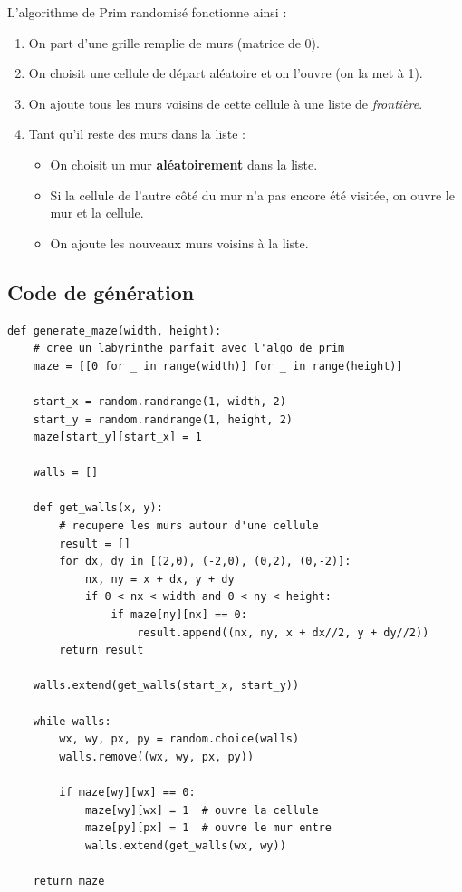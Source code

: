 \documentclass[12pt,a4paper]{article}
\begin{document}
L'algorithme de Prim randomisé fonctionne ainsi :
\begin{enumerate}
    \item On part d'une grille remplie de murs (matrice de 0).
    \item On choisit une cellule de départ aléatoire et on l'ouvre (on la met à 1).
    \item On ajoute tous les murs voisins de cette cellule à une liste de \textit{frontière}.
    \item Tant qu'il reste des murs dans la liste :
    \begin{itemize}
        \item On choisit un mur \textbf{aléatoirement} dans la liste.
        \item Si la cellule de l'autre côté du mur n'a pas encore été visitée, on ouvre le mur et la cellule.
        \item On ajoute les nouveaux murs voisins à la liste.
    \end{itemize}
\end{enumerate}

\subsection{Code de génération}

\begin{lstlisting}[caption={Génération du labyrinthe parfait avec Prim (\texttt{maze\_prim.py})}]
def generate_maze(width, height):
    # cree un labyrinthe parfait avec l'algo de prim
    maze = [[0 for _ in range(width)] for _ in range(height)]
    
    start_x = random.randrange(1, width, 2)
    start_y = random.randrange(1, height, 2)
    maze[start_y][start_x] = 1
    
    walls = []
    
    def get_walls(x, y):
        # recupere les murs autour d'une cellule
        result = []
        for dx, dy in [(2,0), (-2,0), (0,2), (0,-2)]:
            nx, ny = x + dx, y + dy
            if 0 < nx < width and 0 < ny < height:
                if maze[ny][nx] == 0:
                    result.append((nx, ny, x + dx//2, y + dy//2))
        return result
    
    walls.extend(get_walls(start_x, start_y))
    
    while walls:
        wx, wy, px, py = random.choice(walls)
        walls.remove((wx, wy, px, py))
        
        if maze[wy][wx] == 0:
            maze[wy][wx] = 1  # ouvre la cellule
            maze[py][px] = 1  # ouvre le mur entre
            walls.extend(get_walls(wx, wy))
    
    return maze
\end{lstlisting}
\end{document}

